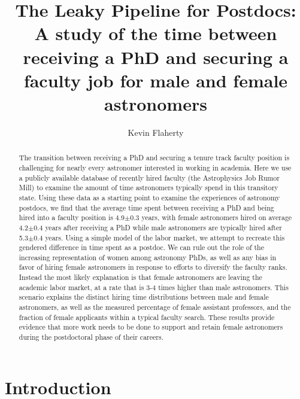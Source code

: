 \documentclass[modern]{aastex62}
\begin{document}
\title{The Leaky Pipeline for Postdocs: A study of the time between receiving a PhD and securing a faculty job for male and female astronomers}

\author[0000-0003-2657-1314]{Kevin Flaherty}



\begin{abstract}
The transition between receiving a PhD and securing a tenure track faculty position is challenging for nearly every astronomer interested in working in academia. Here we use a publicly available database of recently hired faculty (the Astrophysics Job Rumor Mill) to examine the amount of time astronomers typically spend in this transitory state. Using these data as a starting point to examine the experiences of astronomy postdocs, we find that the average time spent between receiving a PhD and being hired into a faculty position is 4.9$\pm$0.3 years, with female astronomers hired on average 4.2$\pm$0.4 years after receiving a PhD while male astronomers are typically hired after 5.3$\pm$0.4 years. Using a simple model of the labor market, we attempt to recreate this gendered difference in time spent as a postdoc. We can rule out the role of the increasing representation of women among astronomy PhDs, as well as any bias in favor of hiring female astronomers in response to efforts to diversify the faculty ranks. Instead the most likely explanation is that female astronomers are leaving the academic labor market, at a rate that is 3-4 times higher than male astronomers. This scenario explains the distinct hiring time distributions between male and female astronomers, as well as the measured percentage of female assistant professors, and the fraction of female applicants within a typical faculty search. These results provide evidence that more work needs to be done to support and retain female astronomers during the postdoctoral phase of their careers. 
\end{abstract}


\section{Introduction}
\end{document}
